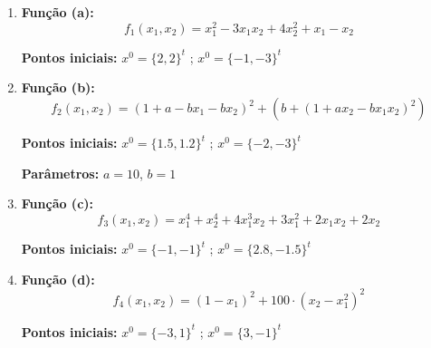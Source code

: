 \documentclass[a4paper, 12pt]{article}
\begin{document}
\begin{enumerate}
\item \textbf{Função (a):}
\begin{equation*}
f_1(x_1, x_2) = x_1^2 - 3x_1x_2 + 4x_2^2 + x_1 - x_2
\end{equation*}



\begin{center}
    \textbf{Pontos iniciais:} $x^0 = \{2, 2\}^t$ ; $x^0 = \{-1, -3\}^t$\\
\end{center}

\item \textbf{Função (b):}
\begin{equation*}
    f_2(x_1, x_2) = (1 + a - b x_1 - b x_2)^2 + \left( b + (1 + a x_2 - b x_1 x_2)^2 \right)
\end{equation*}



\begin{center}
    \textbf{Pontos iniciais:} $x^0 = \{1.5, 1.2\}^t$ ; $x^0 = \{-2, -3\}^t$\\
\end{center}

\begin{center}
    \textbf{Parâmetros:} $a = 10$, $b = 1$    
\end{center}



\item \textbf{Função (c):}
\begin{equation*}
    f_3(x_1, x_2) = x_1^4 + x_2^4 + 4x_1^3x_2 + 3x_1^2 + 2x_1x_2 + 2x_2
\end{equation*}


\begin{center}
    \textbf{Pontos iniciais:} $x^0 = \{-1, -1\}^t$ ; $x^0 = \{2.8, -1.5\}^t$\\
\end{center}


\item \textbf{Função (d):}
\begin{equation*}
    f_4(x_1, x_2) = (1 - x_1)^2 + 100 \cdot (x_2 - x_1^2)^2
\end{equation*}



\begin{center}
    \textbf{Pontos iniciais:} $x^0 = \{-3, 1\}^t$ ; $x^0 = \{3, -1\}^t$\\
\end{center}

\end{enumerate}
\end{document}
